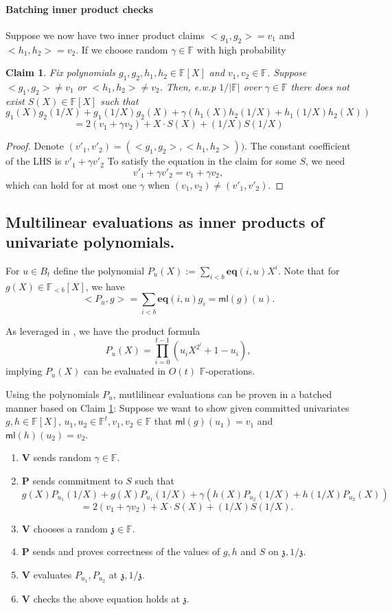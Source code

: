 \documentclass[11pt]{article} %
\newcommand{\F}{\ensuremath{\mathbb F}\xspace}
\newcommand{\defeq}{:=}
\newcommand{\prv}{\ensuremath{\mathsf{\mathbf{P}}}\xspace}
\newcommand{\ver}{\ensuremath{\mathsf{\mathbf{V}}}\xspace}
\newcommand{\polysofdeg}[1]{\ensuremath{\F_{< #1}[X]}\xspace}
\newcommand{\polys}{\ensuremath{\F[X]}\xspace}
\newcommand{\sumi}[1]{\sum_{i< #1}}
\newtheorem{claim}[lemma]{Claim}
\newcommand{\eq}{\ensuremath{\mathsf{eq}}\xspace}
\renewcommand{\eq}{\ensuremath{\mathbf{eq}}\xspace}
\newcommand{\eqpol}[1]{\ensuremath{P_{#1}}\xspace}
\newcommand{\mle}[1]{\ensuremath{\mathsf{ml}(#1)}\xspace}
\newcommand{\prodt}{\ensuremath{\prod_{i=0}^{t-1}}\xspace}
\newcommand{\B}[1]{\ensuremath{B_{#1}}\xspace}
\renewcommand{\zeta}{\mathfrak{z}}
\newcommand{\xinv}{\ensuremath{1/X}\xspace}
\begin{document}
\paragraph{Batching inner product checks}

Suppose we now have two  inner product claims  $<g_1,g_2>=v_1$ and $<h_1,h_2>=v_2$. 
If we choose random $\gamma \in \F$ with high probability
\begin{claim}\label{claim:batchipa}
 Fix polynomials $g_1,g_2,h_1,h_2\in \polys$ and $v_1,v_2\in \F$.
 Suppose $<g_1,g_2>\neq v_1$ or $<h_1,h_2>\neq v_2$. Then, e.w.p $1/|\F|$ over $\gamma\in \F$
 there does not exist $S(X)\in\polys$ such that
\[ g_1(X)g_2(\xinv)+ g_1(\xinv) g_2(X) + \gamma(h_1(X)h_2(\xinv) + h_1(\xinv)h_2(X)) \]
\[= 2(v_1+\gamma v_2) + X\cdot S(X)+(\xinv)S(\xinv)\]
 
\end{claim}
\begin{proof}
Denote $(v'_1,v'_2)=(<g_1,g_2>,<h_1,h_2>))$.
 The constant coefficient of the LHS is $v'_1+\gamma v'_2$
To satisfy the equation in the claim for some $S$, we need
 \[v'_1+\gamma v'_2=v_1+\gamma v_2,\]
which can hold for at most one $\gamma$ when $(v_1,v_2)\neq (v'_1,v'_2)$.
\end{proof}

\subsection{Multilinear evaluations as inner products of univariate polynomials.}
For $u\in \B{t}$ define the polynomial $\eqpol{u} (X)\defeq  \sumi{b}\eq(i,u)X^i$. 
Note that for $g(X)\in \polysofdeg{b}$, we have
\[<\eqpol{u},g>=\sumi{b}\eq(i,u) g_i = \mle{g}(u).\]

As leveraged in \cite{halo}, we have the product formula
\[\eqpol{u}(X)=\prodt\left(u_i X^{2^i}+1-u_i\right),
\]
implying $\eqpol{u}(X)$ can be evaluated in $O(t)$ \F-operations.

Using the polynomials \eqpol{u}, mutlilinear evaluations can be proven in a batched manner based on Claim \ref{claim:batchipa}:
Suppose we want to show given committed univariates $g,h\in\polys$, $u_1,u_2\in \F^t,v_1,v_2\in \F$ that
$\mle{g}(u_1)=v_1$ and $\mle{h}(u_2)=v_2$.
\begin{enumerate}
 \item \ver sends random $\gamma\in \F$.
 \item \prv sends commitment to $S$ such that
\[ g(X)P_{u_1}(1/X)+ g(X) P_{u_1}(1/X) + \gamma(h(X)P_{u_2}(1/X) + h(1/X)P_{u_2}(X))\]
\[= 2(v_1+\gamma v_2) + X\cdot S(X)+(1/X)S(1/X).\]
\item \ver chooses a random $\zeta\in \F$.
\item \prv sends and proves correctness of the values of $g,h$ and $S$ on $\zeta,1/\zeta$. 
\item \ver evaluates $P_{u_1},P_{u_2}$ at $\zeta,1/\zeta$. 
\item \ver checks the above equation holds at $\zeta$.
\end{enumerate}
\end{document}
